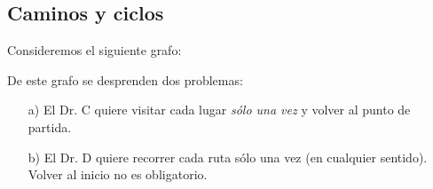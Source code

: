 \subsection{Caminos y ciclos}

Consideremos el siguiente grafo:

\begin{figure}
    \centering
\end{figure}

\begin{prob}
    De este grafo se desprenden dos problemas:
    \begin{enumerate}
        \item[a)] El Dr. C quiere visitar cada lugar \textit{sólo una vez} y volver al punto de partida.
        \item[b)] El Dr. D quiere recorrer cada ruta sólo una vez (en cualquier sentido). Volver al inicio no es obligatorio.
    \end{enumerate}
\end{prob}

